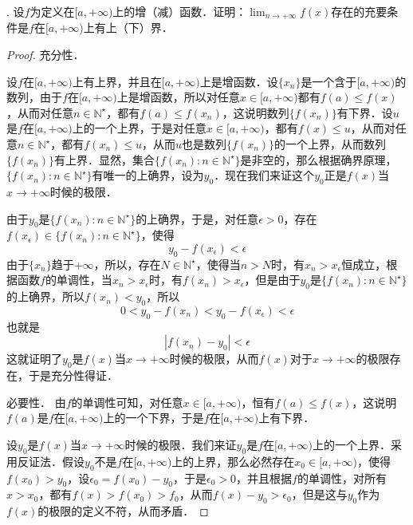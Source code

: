 \documentclass{ctexart}
\theoremstyle{definition}
\theoremstyle{definition}
\theoremstyle{plain}
\theoremstyle{plain}
\theoremstyle{plain}
\theoremstyle{definition}
\newcommand{\nat}{\mathbb{N}^\star}
\begin{document}
. 设$f$为定义在$[a, +\infty)$上的增（减）函数．证明：$\displaystyle \lim_{n \to +\infty} f(x)$存在的充要条件是$f$在$[a, +\infty)$上有上（下）界．
\begin{proof}
充分性．

\noindent 设$f$在$[a, +\infty)$上有上界，并且在$[a, +\infty)$上是增函数．设$\{ x_n \}$是一个含于$[a, +\infty)$的数列，由于$f$在$[a, +\infty)$上是增函数，所以对任意$x \in [a, +\infty)$都有$f(a) \leq f(x)$，从而对任意$n \in \nat$，都有$f(a) \leq f(x_n)$，这说明数列$\{ f(x_n) \}$有下界．设$u$是$f$在$[a, +\infty)$上的一个上界，于是对任意$x \in [a, +\infty)$，都有$f(x) \leq u$，从而对任意$n \in \nat$，都有$f(x_n) \leq u$，从而$u$也是数列$\{ f(x_n) \}$的一个上界，从而数列$\{ f(x_n) \}$有上界．显然，集合$\{ f(x_n) : n \in \nat \}$是非空的，那么根据确界原理，$\{ f(x_n) : n \in \nat \}$有唯一的上确界，设为$y_0$．现在我们来证这个$y_0$正是$f(x)$当$x \to +\infty$时候的极限．

\noindent 由于$y_0$是$\{ f(x_n) : n \in \nat \}$的上确界，于是，对任意$\epsilon > 0$，存在$f(x_\epsilon) \in \{ f(x_n) : n \in \nat \}$，使得
\begin{equation}
    y_0 - f(x_\epsilon) < \epsilon
\end{equation}
由于$\{ x_n \}$趋于$+\infty$，所以，存在$N \in \nat$，使得当$n > N$时，有$x_n > x_\epsilon$恒成立，根据函数$f$的单调性，当$x_n > x_\epsilon$时，有$f(x_n) > x_\epsilon$，但是由于$y_0$是$\{ f(x_n):n\in\nat\}$的上确界，所以$f(x_n) < y_0$，所以
\begin{equation}
    0 < y_0 - f(x_n) < y_0 - f(x_\epsilon) < \epsilon
\end{equation}
也就是
\begin{equation}
    |f(x_n) - y_0| < \epsilon
\end{equation}
这就证明了$y_0$是$f(x)$当$x \to +\infty$时候的极限，从而$f(x)$对于$x \to +\infty$的极限存在，于是充分性得证．

\noindent 必要性．
由$f$的单调性可知，对任意$x \in [a, +\infty)$，恒有$f(a) \leq f(x)$，这说明$f(a)$是$f$在$[a, +\infty)$上的一个下界，于是$f$在$[a, +\infty)$上有下界．

\noindent 设$y_0$是$f(x)$当$x \to +\infty$时候的极限．我们来证$y_0$是$f$在$[a, +\infty)$上的一个上界．采用反证法．假设$y_0$不是$f$在$[a, +\infty)$上的上界，那么必然存在$x_0 \in [a, +\infty)$，使得$f(x_0) > y_0$，设$\epsilon_0 = f(x_0) - y_0$，于是$\epsilon_0 > 0$，并且根据$f$的单调性，对所有$x > x_0$，都有$f(x) > f(x_0) > f_0$，从而$f(x) - y_0 > \epsilon_0$，但是这与$y_0$作为$f(x)$的极限的定义不符，从而矛盾．
\end{proof}
\end{document}
